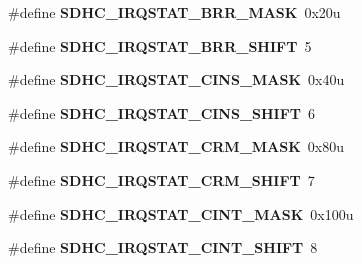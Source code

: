 \begin{DoxyCompactItemize}
\item 
\hypertarget{group___s_d_h_c___register___masks_ga1fe45c7843da8575982210d04128ecbb}{}\#define {\bfseries S\+D\+H\+C\+\_\+\+I\+R\+Q\+S\+T\+A\+T\+\_\+\+B\+R\+R\+\_\+\+M\+A\+S\+K}~0x20u\label{group___s_d_h_c___register___masks_ga1fe45c7843da8575982210d04128ecbb}

\item 
\hypertarget{group___s_d_h_c___register___masks_gadcde5821bbaae429a3695d5659ae3bdc}{}\#define {\bfseries S\+D\+H\+C\+\_\+\+I\+R\+Q\+S\+T\+A\+T\+\_\+\+B\+R\+R\+\_\+\+S\+H\+I\+F\+T}~5\label{group___s_d_h_c___register___masks_gadcde5821bbaae429a3695d5659ae3bdc}

\item 
\hypertarget{group___s_d_h_c___register___masks_gac07a12c2bb074099c7c4a5f17c1bf5c1}{}\#define {\bfseries S\+D\+H\+C\+\_\+\+I\+R\+Q\+S\+T\+A\+T\+\_\+\+C\+I\+N\+S\+\_\+\+M\+A\+S\+K}~0x40u\label{group___s_d_h_c___register___masks_gac07a12c2bb074099c7c4a5f17c1bf5c1}

\item 
\hypertarget{group___s_d_h_c___register___masks_ga8da6855a46f5dc5bb5e94d946d87eae4}{}\#define {\bfseries S\+D\+H\+C\+\_\+\+I\+R\+Q\+S\+T\+A\+T\+\_\+\+C\+I\+N\+S\+\_\+\+S\+H\+I\+F\+T}~6\label{group___s_d_h_c___register___masks_ga8da6855a46f5dc5bb5e94d946d87eae4}

\item 
\hypertarget{group___s_d_h_c___register___masks_ga79582ca6d6de265f0ebb399eb008af71}{}\#define {\bfseries S\+D\+H\+C\+\_\+\+I\+R\+Q\+S\+T\+A\+T\+\_\+\+C\+R\+M\+\_\+\+M\+A\+S\+K}~0x80u\label{group___s_d_h_c___register___masks_ga79582ca6d6de265f0ebb399eb008af71}

\item 
\hypertarget{group___s_d_h_c___register___masks_gab7f485316bf04aaf4f729e69cd6acb01}{}\#define {\bfseries S\+D\+H\+C\+\_\+\+I\+R\+Q\+S\+T\+A\+T\+\_\+\+C\+R\+M\+\_\+\+S\+H\+I\+F\+T}~7\label{group___s_d_h_c___register___masks_gab7f485316bf04aaf4f729e69cd6acb01}

\item 
\hypertarget{group___s_d_h_c___register___masks_ga2d0fb2d9616c809a5610a537d015ddb6}{}\#define {\bfseries S\+D\+H\+C\+\_\+\+I\+R\+Q\+S\+T\+A\+T\+\_\+\+C\+I\+N\+T\+\_\+\+M\+A\+S\+K}~0x100u\label{group___s_d_h_c___register___masks_ga2d0fb2d9616c809a5610a537d015ddb6}

\item 
\hypertarget{group___s_d_h_c___register___masks_gaf1eb220f726f19220232275f4ba4c42b}{}\#define {\bfseries S\+D\+H\+C\+\_\+\+I\+R\+Q\+S\+T\+A\+T\+\_\+\+C\+I\+N\+T\+\_\+\+S\+H\+I\+F\+T}~8\label{group___s_d_h_c___register___masks_gaf1eb220f726f19220232275f4ba4c42b}


\end{DoxyCompactItemize}
